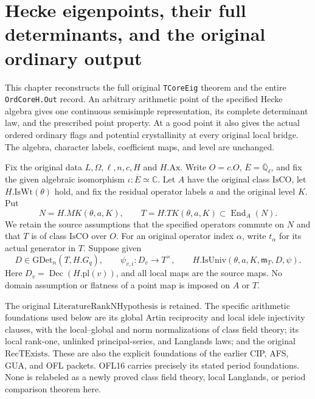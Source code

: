 \documentclass[11pt,a4paper]{article}
\numberwithin{equation}{section}
\theoremstyle{remark}\newtheorem{remark}[theorem]{Remark}
\begin{document}
\section{Hecke eigenpoints, their full determinants, and the original ordinary output}
\label{sec:hecke-eigenpoints-v44}

This chapter reconstructs the full original \texttt{TCore\allowbreak Eig} theorem
and the entire \texttt{Ord\allowbreak Core\allowbreak H.\allowbreak Out} record.  An arbitrary arithmetic
point of the specified Hecke algebra gives one continuous semisimple
representation, its complete determinant law, and the prescribed point
property.  At a good point it also gives the actual ordered ordinary
flags and potential crystallinity at every original local bridge.
The algebra, character labels, coefficient maps, and level are unchanged.

Fix the original data $L,\Omega,\ell,n,c,H$ and $H.\mathrm{Ax}$.
Write $O=c.O$, $\overline E=\overline{\mathbb Q}_\ell$, and fix the
given algebraic isomorphism $\iota:\overline E\simeq\mathbb C$.
Let $A$ have the original class $\mathrm{IsCO}$, let
$H.\mathrm{IsWt}(\theta)$ hold, and fix the residual operator labels
$a$ and the original level $K$.  Put
\[
 N=H.MK(\theta,a,K),\qquad T=H.TK(\theta,a,K)
       \subset\operatorname{End}_A(N).
 \tag{HEP.1}
\]
We retain the source assumptions that the specified operators commute
on $N$ and that $T$ is of class $\mathrm{IsCO}$ over $O$.
For an original operator index $\alpha$, write $t_\alpha$ for its
actual generator in $T$.  Suppose given
\[
 D\in\mathrm{GDet}_n(T,H.G_q),\qquad
 \psi_{v,i}:D_v\longrightarrow T^\times,
 \qquad H.\mathrm{IsUniv}(\theta,a,K,\mathfrak m_T,D,\psi).
 \tag{HEP.2}
\]
Here $D_v=\operatorname{Dec}(H.\mathrm{pl}(v))$, and all local maps
are the source maps.  No domain assumption or flatness of a point
map is imposed on $A$ or $T$.

The original $\mathrm{LiteratureRankNHypothesis}$ is retained.
The specific arithmetic foundations used below are its global Artin
reciprocity and local idele injectivity clauses, with the local--global
and norm normalizations of class field theory; its local rank-one,
unlinked principal-series, and Langlands laws; and the original
$\mathrm{RecTExists}$.  These are also the explicit foundations of
the earlier CIP, AFS, GUA, and OFL packets.  OFL16 carries precisely
its stated period foundations.  None is relabeled as a newly proved
class field theory, local Langlands, or period comparison theorem here.
\end{document}
